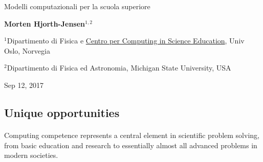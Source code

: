 \documentclass[%
oneside,                 %
final,                   %
10pt]{article}
\begin{document}

\newcommand{\exercisesection}[1]{\subsection*{#1}}






\thispagestyle{empty}

\begin{center}
{\LARGE\bf
\begin{spacing}{1.25}
Modelli computazionali per la scuola superiore
\end{spacing}
}
\end{center}


\begin{center}
{\bf Morten Hjorth-Jensen${}^{1, 2}$} \\ [0mm]
\end{center}

\begin{center}
\centerline{{\small ${}^1$Dipartimento di Fisica e \href{{http://www.mn.uio.no/ccse/english/people/index.html}}{Centro per Computing in Science Education}, Univ Oslo, Norvegia}}
\centerline{{\small ${}^2$Dipartimento di Fisica ed Astronomia, Michigan State University, USA}}
\end{center}
    

\begin{center}
Sep 12, 2017
\end{center}

\vspace{1cm}


\subsection*{Unique opportunities}

\paragraph{}
Computing competence represents a central element
in scientific problem solving, from basic education and research to
essentially almost all advanced problems in modern
societies.
\end{document}
